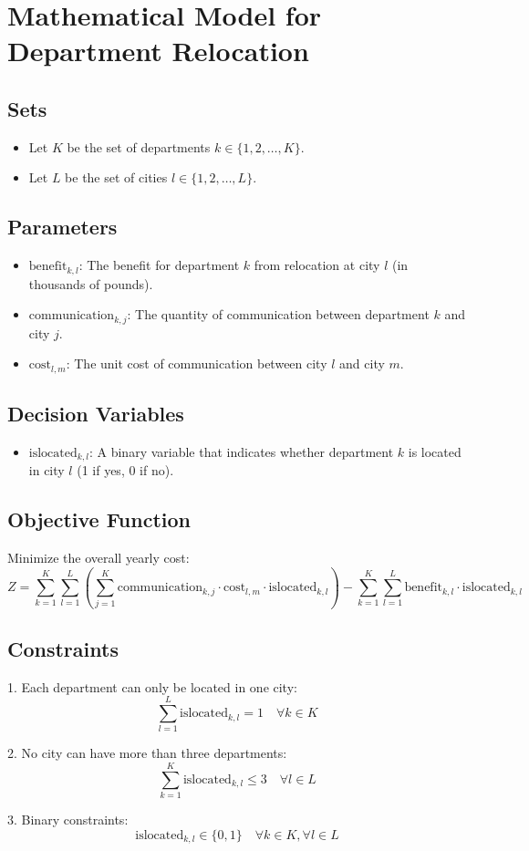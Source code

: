 \documentclass{article}
\begin{document}
\section*{Mathematical Model for Department Relocation}

\subsection*{Sets}
\begin{itemize}
    \item Let \( K \) be the set of departments \( k \in \{1, 2, \ldots, K\} \).
    \item Let \( L \) be the set of cities \( l \in \{1, 2, \ldots, L\} \).
\end{itemize}

\subsection*{Parameters}
\begin{itemize}
    \item \( \text{benefit}_{k, l} \): The benefit for department \( k \) from relocation at city \( l \) (in thousands of pounds).
    \item \( \text{communication}_{k, j} \): The quantity of communication between department \( k \) and city \( j \).
    \item \( \text{cost}_{l, m} \): The unit cost of communication between city \( l \) and city \( m \).
\end{itemize}

\subsection*{Decision Variables}
\begin{itemize}
    \item \( \text{islocated}_{k, l} \): A binary variable that indicates whether department \( k \) is located in city \( l \) (1 if yes, 0 if no).
\end{itemize}

\subsection*{Objective Function}
Minimize the overall yearly cost:
\[
Z = \sum_{k=1}^{K} \sum_{l=1}^{L} \left( \sum_{j=1}^{K} \text{communication}_{k, j} \cdot \text{cost}_{l, m} \cdot \text{islocated}_{k, l} \right) - \sum_{k=1}^{K} \sum_{l=1}^{L} \text{benefit}_{k, l} \cdot \text{islocated}_{k, l}
\]

\subsection*{Constraints}
1. Each department can only be located in one city:
\[
\sum_{l=1}^{L} \text{islocated}_{k, l} = 1 \quad \forall k \in K
\]

2. No city can have more than three departments:
\[
\sum_{k=1}^{K} \text{islocated}_{k, l} \leq 3 \quad \forall l \in L
\]

3. Binary constraints:
\[
\text{islocated}_{k, l} \in \{0, 1\} \quad \forall k \in K, \forall l \in L
\]
\end{document}
